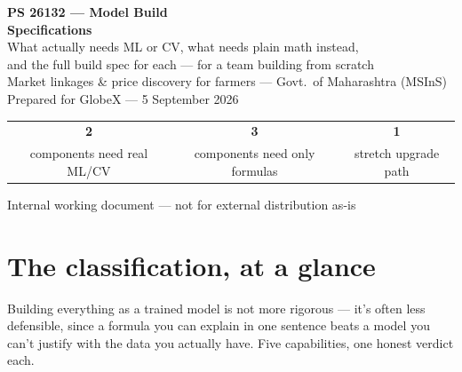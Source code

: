 \documentclass[11pt]{article}
\begin{document}
\begin{titlepage}
\centering
\vspace*{1.6cm}
{\Huge\bfseries\color{gxteal} PS 26132 --- Model Build}\\[0.4em]
{\Huge\bfseries\color{gxteal} Specifications}\\[1.8em]
{\Large\color{gxslate} What actually needs ML or CV, what needs plain math instead,}\\[0.3em]
{\Large\color{gxslate} and the full build spec for each --- for a team building from scratch}\\[3em]
{\normalsize\color{gxslate} Market linkages \& price discovery for farmers --- Govt.\ of Maharashtra (MSInS)}\\[0.3em]
{\normalsize\color{gxslate} Prepared for GlobeX --- 5 September 2026}\\[2.6em]
\begin{tabular}{ccc}
\textbf{\color{gxcyan}\Large 2} & \textbf{\color{gxgreen}\Large 3} & \textbf{\color{gxamber}\Large 1} \\
{\small components need real ML/CV} & {\small components need only formulas} & {\small stretch upgrade path} \\
\end{tabular}
\vfill
{\footnotesize\color{gxslate} Internal working document --- not for external distribution as-is}
\end{titlepage}

\section{The classification, at a glance}
Building everything as a trained model is not more rigorous --- it's often less defensible, since a formula
you can explain in one sentence beats a model you can't justify with the data you actually have. Five
capabilities, one honest verdict each.
\end{document}
